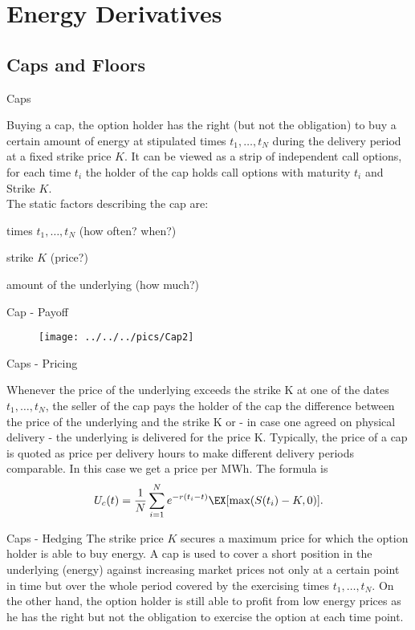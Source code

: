 \section{Energy Derivatives}
\subsection{Caps and  Floors}

{Caps}

Buying a cap, the option holder has the right (but not the
obligation) to buy a certain amount of energy at stipulated times
$t_1,\ldots,t_N$ during the delivery period at a fixed strike
price $K$. It can be viewed as a strip of
independent call options, for each time $t_i$ the holder of the cap holds call options with maturity $t_i$ and Strike $K$. \\
The static factors describing the cap are:
\item times $t_1,\ldots,t_N$ (how often? when?)
\item strike $K$ (price?)
\item amount of the underlying (how much?)

{Cap - Payoff}
\begin{figure}
	\centering
		\texttt{[image: ../../../pics/Cap2]}
	\label{fig:Cap2}
\end{figure}

{Caps - Pricing}

Whenever the price of the underlying exceeds the strike K at one of the dates $t_1,\ldots,t_N$, the seller of the cap pays the holder of the cap the difference between the price of the underlying and the strike K or - in case one agreed on physical delivery - the underlying is delivered for the price K.
Typically, the price of a cap is quoted as price per delivery hours to make
different delivery periods comparable. In this case we get a price
per MWh. The formula is
$$U_c(t)=\frac{1}{N}\sum_{i=1}^Ne^{-r(t_i-t)}\EX[\max(S(t_i)-K,0)].$$

{Caps - Hedging}
The strike price $K$ secures a maximum price for which the option holder is able to buy energy. A cap is used to cover a short position in the underlying (energy) against
increasing market prices not only at a certain point in time but over the whole period covered by the exercising times $t_1,\ldots,t_N$.
On the other hand, the option holder is still able to profit from low energy prices as he has the right but not the obligation to exercise the option at each time point.

